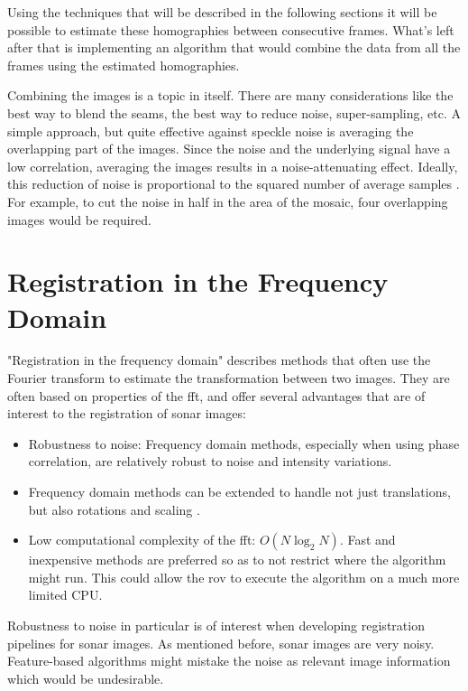 Using the techniques that will be described in the following sections it will be possible to estimate these homographies between consecutive frames. What's left after that is implementing an algorithm that would combine the data from all the frames using the estimated homographies.

Combining the images is a topic in itself. There are many considerations like the best way to blend the seams, the best way to reduce noise, super-sampling, etc. A simple approach, but quite effective against speckle noise is averaging the overlapping part of the images. Since the noise and the underlying signal have a low correlation, averaging the images results in a noise-attenuating effect. Ideally, this reduction of noise is proportional to the squared number of average samples \cite{Hurtos2015}. For example, to cut the noise in half in the area of the mosaic, four overlapping images would be required. 

\section{Registration in the Frequency Domain}

"Registration in the frequency domain" describes methods that often use the Fourier transform to estimate the transformation between two images. They are often based on properties of the \acrfull{fft}, and offer several advantages that are of interest to the registration of sonar images:
\begin{itemize}
    \item Robustness to noise: Frequency domain methods, especially when using phase correlation, are relatively robust to noise and intensity variations\cite{Reddy1996}.
    \item Frequency domain methods can be extended to handle not just translations, but also rotations and scaling \cite{Reddy1996}.
    \item Low computational complexity of the \acrshort{fft}:  \(O(N\log_2N)\)\cite{Haynal2011}. Fast and inexpensive methods are preferred so as to not restrict where the algorithm might run. This could allow the \acrshort{rov} to execute the algorithm on a much more limited CPU.
\end{itemize}

Robustness to noise in particular is of interest when developing registration pipelines for sonar images. As mentioned before, sonar images are very noisy. Feature-based algorithms might mistake the noise as relevant image information which would be undesirable.

